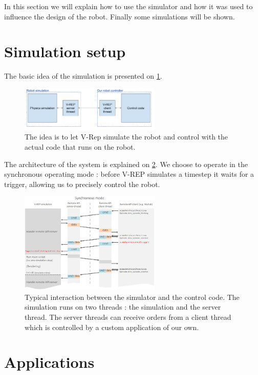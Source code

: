 In this section we will explain how to use the simulator and how it was used to influence the design of the robot. Finally some simulations will be shown.

\section{Simulation setup}
The basic idea of the simulation is presented on \cref{fig:simulation_principles}.

\begin{figure}[htp]
\center
\includegraphics[width=0.6\textwidth]{figures/simulation_principles}
\caption[Simulation principles]{The idea is to let V-Rep simulate the robot and control with the actual code that runs on the robot.}
\label{fig:simulation_principles}
\end{figure}

The architecture of the system is explained on \cref{fig:remoteApi}. We choose to operate in the synchronous operating mode : before V-REP simulates a timestep it waits for a trigger, allowing us to precisely control the robot.

\begin{figure}[htp]
\center
\includegraphics[width=0.6\textwidth]{figures/remoteApiSynchronous}
\caption[Simulation interaction]{Typical interaction between the simulator and the control code. The simulation runs on two threads : the simulation and the server thread. The server threads can receive orders from a client thread which is controlled by a custom application of our own.}
\label{fig:remoteApi}
\end{figure}

\section{Applications}
